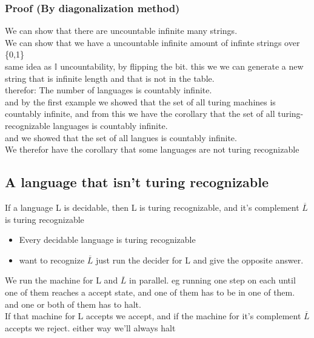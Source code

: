 \documentclass[a4paper,10pt,titlepage]{report}
\begin{document}
\subsubsection{Proof (By diagonalization method)} 

We can show that there are uncountable infinite many strings.\\
We can show that we have a uncountable infinite amount of infinte strings over \{0,1\}\\

same idea as $\mathbb{I}$ uncountability, by flipping the bit. this we we can generate a new string that is infinite length and that is not in the table.\\

therefor: The number of languages is countably infinite.\\

and by the first example we showed that the set of all turing machines is countably infinite, and from this we have the corollary that the set of all turing-recognizable languages is countably infinite.\\
and we showed that the set of all langues is countably infinite.\\
We therefor have the corollary that some languages are not turing recognizable\\

\subsection{A language that isn't turing recognizable}

If a language L is decidable, then L is turing recognizable, and it's complement $\overline{L}$ is turing recognizable\\
\begin{itemize}
\item Every decidable language is turing recognizable
\item want to recognize $\overline{L}$ just run the decider for L and give the opposite answer.
\end{itemize}

We run the machine for L and $\overline{L}$ in parallel. eg running one step on each until one of them reaches a accept state, and one of them has to be in one of them. and one or both of them has to halt.\\

If that machine for L accepts we accept, and if the machine for it's complement $\overline{L}$ accepts we reject. either way we'll always halt\\
\end{document}
